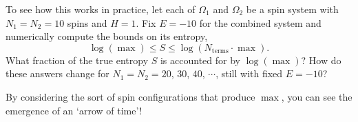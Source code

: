 \documentclass[12 pt]{article} %
\newcommand{\Om}{\ensuremath{\Omega} }
\begin{document}
To see how this works in practice, let each of $\Om_1$ and $\Om_2$ be a spin system with $N_1 = N_2 = 10$ spins and $H = 1$.
Fix $E = -10$ for the combined system and numerically compute the bounds on its entropy,
\begin{equation*}
  \log\left(\max\right) \leq S \leq \log\left(N_{\text{terms}} \cdot \max\right).
\end{equation*}
What fraction of the true entropy $S$ is accounted for by $\log\left(\max\right)$?
How do these answers change for $N_1 = N_2 = 20$, $30$, $40$, $\cdots$, still with fixed $E = -10$?

By considering the sort of spin configurations that produce $\max$, you can see the emergence of an `arrow of time'!
\end{document}
